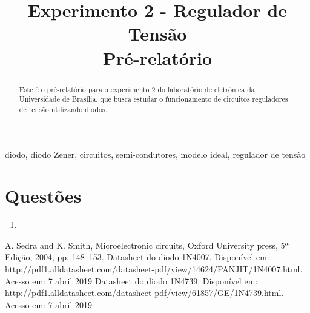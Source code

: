 \documentclass[conference]{IEEEtran}
\begin{document}
\title{Experimento 2 - Regulador de Tensão\\
\break Pré-relatório}

\author{
}
\maketitle

\begin{abstract}
Este é o pré-relatório para o experimento 2 do laboratório de eletrônica da Universidade de Brasília, que busca estudar o funcionamento de circuitos reguladores de tensão utilizando diodos.
\end{abstract}

\begin{IEEEkeywords}
diodo, diodo Zener, circuitos, semi-condutores, modelo ideal, regulador de tensão
\end{IEEEkeywords}

\section{Questões}
\begin{enumerate}
    \item {}
\end{enumerate}

\begin{thebibliography}{00}
 A. Sedra and K. Smith, Microelectronic circuits, Oxford University press, 5ª Edição, 2004, pp. 148--153.
 Datasheet do diodo 1N4007. Disponível em: http://pdf1.alldatasheet.com/datasheet-pdf/view/14624/PANJIT/1N4007.html. Acesso em: 7 abril 2019
 Datasheet do diodo 1N4739. Disponível em: http://pdf1.alldatasheet.com/datasheet-pdf/view/61857/GE/1N4739.html. Acesso em: 7 abril 2019

\end{thebibliography}
\end{document}
